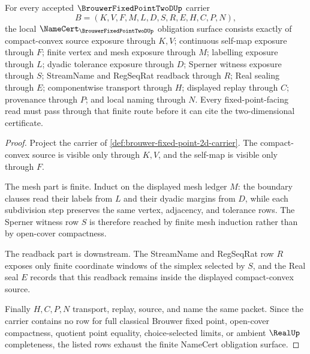 \begin{theorem}
\label{thm:brouwer-fixed-point-2d-namecert-obligations}
For every accepted $\BrouwerFixedPointTwoDUp$ carrier
$$
B=(K,V,F,M,L,D,S,R,E,H,C,P,N),
$$
the local $\NameCert_{\BrouwerFixedPointTwoDUp}$ obligation surface consists exactly of compact-convex source exposure through $K,V$; continuous self-map exposure through $F$; finite vertex and mesh exposure through $M$; labelling exposure through $L$; dyadic tolerance exposure through $D$; Sperner witness exposure through $S$; StreamName and RegSeqRat readback through $R$; Real sealing through $E$; componentwise transport through $H$; displayed replay through $C$; provenance through $P$; and local naming through $N$. Every fixed-point-facing read must pass through that finite route before it can cite the two-dimensional certificate.
\end{theorem}
\begin{proof}
Project the carrier of \autoref{def:brouwer-fixed-point-2d-carrier}. The compact-convex source is visible only through $K,V$, and the self-map is visible only through $F$.

The mesh part is finite. Induct on the displayed mesh ledger $M$: the boundary clauses read their labels from $L$ and their dyadic margins from $D$, while each subdivision step preserves the same vertex, adjacency, and tolerance rows. The Sperner witness row $S$ is therefore reached by finite mesh induction rather than by open-cover compactness.

The readback part is downstream. The StreamName and RegSeqRat row $R$ exposes only finite coordinate windows of the simplex selected by $S$, and the Real seal $E$ records that this readback remains inside the displayed compact-convex source.

Finally $H,C,P,N$ transport, replay, source, and name the same packet. Since the carrier contains no row for full classical Brouwer fixed point, open-cover compactness, quotient point equality, choice-selected limits, or ambient $\RealUp$ completeness, the listed rows exhaust the finite NameCert obligation surface.
\end{proof}


